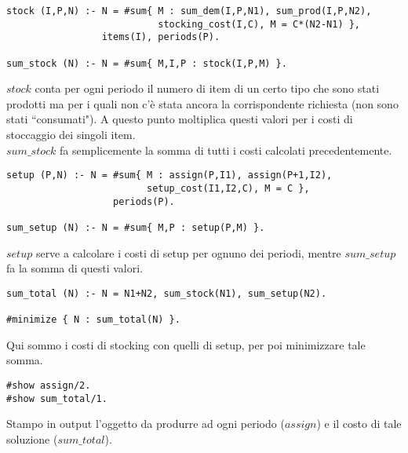 \documentclass[12pt]{article}
\begin{document}
\begin{verbatim}
stock (I,P,N) :- N = #sum{ M : sum_dem(I,P,N1), sum_prod(I,P,N2),
                           stocking_cost(I,C), M = C*(N2-N1) },
                 items(I), periods(P).

sum_stock (N) :- N = #sum{ M,I,P : stock(I,P,M) }.
\end{verbatim}
$stock$ conta per ogni periodo il numero di item di un certo tipo che sono stati prodotti ma per i quali non c'è stata ancora la corrispondente richiesta (non sono stati ``consumati"). A questo punto moltiplica questi valori per i costi di stoccaggio dei singoli item.\\
$sum\_stock$ fa semplicemente la somma di tutti i costi calcolati precedentemente.

\begin{verbatim}
setup (P,N) :- N = #sum{ M : assign(P,I1), assign(P+1,I2),
                         setup_cost(I1,I2,C), M = C },
                   periods(P).

sum_setup (N) :- N = #sum{ M,P : setup(P,M) }.
\end{verbatim}
$setup$ serve a calcolare i costi di setup per ognuno dei periodi, mentre $sum\_setup$ fa la somma di questi valori.
\pagebreak

\begin{verbatim}
sum_total (N) :- N = N1+N2, sum_stock(N1), sum_setup(N2).

#minimize { N : sum_total(N) }.
\end{verbatim}
Qui sommo i costi di stocking con quelli di setup, per poi minimizzare tale somma.

\begin{verbatim}
#show assign/2.
#show sum_total/1.
\end{verbatim}
Stampo in output l'oggetto da produrre ad ogni periodo ($assign$) e il costo di tale soluzione ($sum\_total$).
\end{document}
